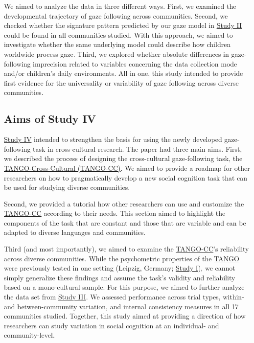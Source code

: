 \documentclass[
]{scrbook}
\begin{document}
We aimed to analyze the data in three different ways. First, we examined the developmental trajectory of gaze following across communities. Second, we checked whether the signature pattern predicted by our gaze model in \hyperref[studyII]{Study II} could be found in all communities studied. With this approach, we aimed to investigate whether the same underlying model could describe how children worldwide process gaze. Third, we explored whether absolute differences in gaze-following imprecision related to variables concerning the data collection mode and/or children's daily environments. All in one, this study intended to provide first evidence for the universality or variability of gaze following across diverse communities.

\subsection{Aims of Study IV}\label{aims-studyIV}

\hyperref[studyIV]{Study IV} intended to strengthen the basis for using the newly developed gaze-following task in cross-cultural research. The paper had three main aims. First, we described the process of designing the cross-cultural gaze-following task, the \hyperref[acronyms_TANGO-CC]{TANGO-Cross-Cultural (TANGO-CC)}. We aimed to provide a roadmap for other researchers on how to pragmatically develop a new social cognition task that can be used for studying diverse communities.

Second, we provided a tutorial how other researchers can use and customize the \hyperref[acronyms_TANGO-CC]{TANGO-CC} according to their needs. This section aimed to highlight the components of the task that are constant and those that are variable and can be adapted to diverse languages and communities.

Third (and most importantly), we aimed to examine the \hyperref[acronyms_TANGO-CC]{TANGO-CC}'s reliability across diverse communities. While the psychometric properties of the \hyperref[acronyms_TANGO]{TANGO} were previously tested in one setting (Leipzig, Germany; \hyperref[studyI]{Study I}), we cannot simply generalize these findings and assume the task's validity and reliability based on a mono-cultural sample. For this purpose, we aimed to further analyze the data set from \hyperref[studyIII]{Study III}. We assessed performance across trial types, within- and between-community variation, and internal consistency measures in all 17 communities studied. Together, this study aimed at providing a direction of how researchers can study variation in social cognition at an individual- and community-level.
\end{document}
